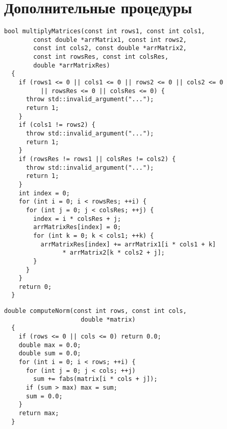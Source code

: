 \documentclass[a4paper,11pt]{article}
\begin{document}
\section{Дополнительные процедуры}
\begin{lstlisting}[label=multiplyMatrices, caption=Multiply Matrices]
  bool multiplyMatrices(const int rows1, const int cols1,
        const double *arrMatrix1, const int rows2,
        const int cols2, const double *arrMatrix2,
        const int rowsRes, const int colsRes,
        double *arrMatrixRes)
  {
    if (rows1 <= 0 || cols1 <= 0 || rows2 <= 0 || cols2 <= 0
          || rowsRes <= 0 || colsRes <= 0) {
      throw std::invalid_argument("...");
      return 1;
    }
    if (cols1 != rows2) {
      throw std::invalid_argument("...");
      return 1;
    }
    if (rowsRes != rows1 || colsRes != cols2) {
      throw std::invalid_argument("...");
      return 1;
    }
    int index = 0;
    for (int i = 0; i < rowsRes; ++i) {
      for (int j = 0; j < colsRes; ++j) {
        index = i * colsRes + j;
        arrMatrixRes[index] = 0;
        for (int k = 0; k < cols1; ++k) {
          arrMatrixRes[index] += arrMatrix1[i * cols1 + k]
                * arrMatrix2[k * cols2 + j];
        }
      }
    }
    return 0;
  }
\end{lstlisting}
\begin{lstlisting}[label=multiplyMatrices, caption=Multiply Matrices]
  double computeNorm(const int rows, const int cols,
                     double *matrix)
  {
    if (rows <= 0 || cols <= 0) return 0.0;
    double max = 0.0;
    double sum = 0.0;
    for (int i = 0; i < rows; ++i) {
      for (int j = 0; j < cols; ++j)
        sum += fabs(matrix[i * cols + j]);
      if (sum > max) max = sum;
      sum = 0.0;
    }
    return max;
  }
\end{lstlisting}
\end{document}
